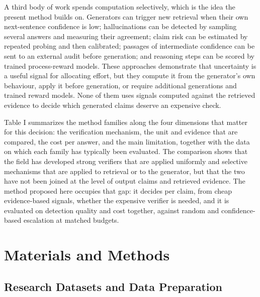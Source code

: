 \documentclass[conference]{IEEEtran}
\begin{document}
A third body of work spends computation selectively, which is the idea the present method builds on. Generators can trigger new retrieval when their own next-sentence confidence is low; hallucinations can be detected by sampling several answers and measuring their agreement; claim risk can be estimated by repeated probing and then calibrated; passages of intermediate confidence can be sent to an external audit before generation; and reasoning steps can be scored by trained process-reward models. These approaches demonstrate that uncertainty is a useful signal for allocating effort, but they compute it from the generator's own behaviour, apply it before generation, or require additional generations and trained reward models. None of them uses signals computed against the retrieved evidence to decide which generated claims deserve an expensive check.

Table I summarizes the method families along the four dimensions that matter for this decision: the verification mechanism, the unit and evidence that are compared, the cost per answer, and the main limitation, together with the data on which each family has typically been evaluated. The comparison shows that the field has developed strong verifiers that are applied uniformly and selective mechanisms that are applied to retrieval or to the generator, but that the two have not been joined at the level of output claims and retrieved evidence. The method proposed here occupies that gap: it decides per claim, from cheap evidence-based signals, whether the expensive verifier is needed, and it is evaluated on detection quality and cost together, against random and confidence-based escalation at matched budgets.

\section{Materials and Methods}

\subsection{Research Datasets and Data Preparation}
\end{document}
